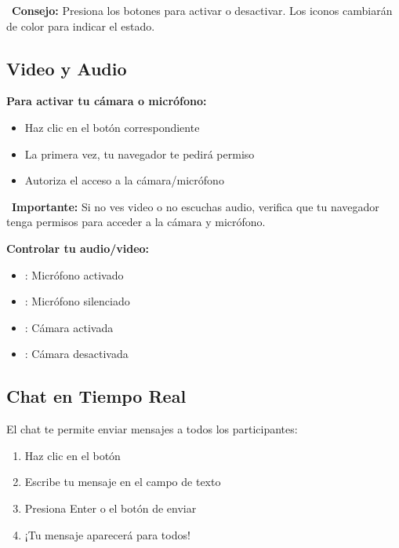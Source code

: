 \documentclass[11pt,a4paper]{article}
\begin{document}
\begin{tipbox}
    \faLightbulb\ \textbf{Consejo:} Presiona los botones para activar o desactivar. Los iconos cambiarán de color para indicar el estado.
\end{tipbox}

\subsection{Video y Audio}

\textbf{Para activar tu cámara o micrófono:}
\begin{itemize}
    \item Haz clic en el botón correspondiente
    \item La primera vez, tu navegador te pedirá permiso
    \item Autoriza el acceso a la cámara/micrófono
\end{itemize}

\begin{warningbox}
    \faExclamationTriangle\ \textbf{Importante:} Si no ves video o no escuchas audio, verifica que tu navegador tenga permisos para acceder a la cámara y micrófono.
\end{warningbox}

\textbf{Controlar tu audio/video:}
\begin{itemize}
    \item \textcolor{charlatonCyan}{\faMicrophone}: Micrófono activado
    \item \textcolor{red}{\faMicrophoneSlash}: Micrófono silenciado
    \item \textcolor{charlatonBlue}{\faVideo}: Cámara activada
    \item \textcolor{red}{\faVideoSlash}: Cámara desactivada
\end{itemize}

\subsection{Chat en Tiempo Real}

El chat te permite enviar mensajes a todos los participantes:

\begin{enumerate}[leftmargin=2cm]
    \item Haz clic en el botón \textcolor{charlatonOrange}{\faComments}
    \item Escribe tu mensaje en el campo de texto
    \item Presiona Enter o el botón de enviar
    \item ¡Tu mensaje aparecerá para todos!
\end{enumerate}
\end{document}
